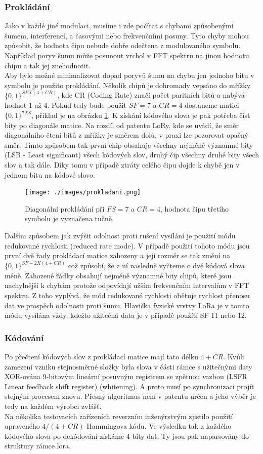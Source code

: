 \documentclass{ctuthesis}
\begin{document}
\subsubsection{Prokládání}
Jako v každé jiné modulaci, musíme i zde počítat s chybami způsobenými šumem, interferencí, a časovými nebo frekvenčními posuny. Tyto chyby mohou způsobit, že hodnota čipu nebude dobře odečtena z modulovaného symbolu. Například poryv šumu může posunout vrchol v FFT spektru na jinou hodnotu chipu a tak jej znehodnotit.\\
Aby bylo možné minimalizovat dopad poryvů šumu na chybu jen jednoho bitu v symbolu je použito prokládání. Několik chipů je dohromady vepsáno do mřížky $\{0,1\}^{SF X (4 + CR)}$, kde CR (Coding Rate) značí počet paritních bitů a nabývá hodnot 1 až 4. Pokud tedy bude použit $SF = 7$ a $CR =4$ dostaneme matici  $\{0,1\}^{7 X 8}$, příklad je na obrázku \ref{fig:lora1}. K získání kódového slova je pak potřeba číst bity po diagonále matice. Na rozdíl od patentu LoRy, kde se uvádí, že směr diagonálního čtení bitů z mřížky je směrem dolů, v praxi lze pozorovat opačný směr. Tímto způsobem tak první chip obsahuje všechny nejméně významné bity (LSB - Least significant) všech kódových slov, druhý čip všechny druhé bity všech slov a tak dále. Díky tomu v případě ztráty celého čipu dojde k chybě jen v jednom bitu na kódové slovo.\\
\begin{figure}
\caption{Diagonální prokládání při $FS=7$ a $CR =4$, hodnota čipu třetího symbolu je vyznačena tučně.   \cite{gr-lora2018}}
\texttt{[image: ./images/prokladani.png]}
\label{fig:lora1}
\end{figure}
Dalším způsobem jak zvýšit odolnost proti rušení vysílání je použití módu redukované rychlosti (reduced rate mode). V případě použití tohoto módu jsou první dvě řady prokládací matice zahozeny a její rozměr se tak změní na $\{0,1\}^{SF-2 X (4 + CR)}$ což způsobí, že z ní nasledně vyčteme o dvě kódová slova méně. Zahozené řádky obsahují nejméně významné bity chipů, které jsou nachylnější k chybám protože odpovídají užším frekvenčním intervalům v FFT spektru. Z toho vyplývá, že mód redukované rychlosti obětuje rychlost přenosu dat ve prospěch odolnosti proti šumu. Hlavička fyzické vrstvy LoRa je v tomto módu vysílána vždy, kdežto užitečná data je v případě použítí SF 11 nebo 12.

\subsubsection{Kódování}
Po přečtení kódových slov z prokládací matice mají tato délku $4 + CR$. Kvůli zamezení vzniku stejnosměrné složky byla slova v části rámce s užitečnými daty XOR-ována 9-bitovým lineární posuvným registrem se zpětnou vazbou (LSFR Linear feedback shift register) (whitening). A proto musí po synchronizaci projít stejným procesem znovu. Přesný algoritmus není v patentu určen a jeho výběr je tedy na každém výrobci zvlášť. \\
Na několika testovacích zařízeních \cite{gr-lora2018} reverzním inženýrstvým zjistilo použití upraveného $4/(4 + CR)$ Hammingova kódu. Ve výsledku tak z každého kódového slova po dekódování získáme 4 bity dat. Ty jsou pak naparsovány do struktury rámce lora.
\end{document}
